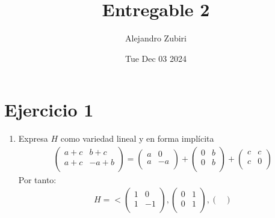 \documentclass{article}
\author{Alejandro Zubiri}
\date{Tue Dec 03 2024}
\title{Entregable 2}
\begin{document}
\maketitle
\tableofcontents
\pagebreak

\section{Ejercicio 1}
\begin{enumerate}[label = (\alph*)]
    \item Expresa $H$ como variedad lineal y en forma implícita
    \begin{equation}
        \begin{split}
            \begin{pmatrix}
                a+c & b+c \\
                a+c & -a+b \\
                \end{pmatrix} = \begin{pmatrix}
                a & 0 \\
                a & -a \\
                \end{pmatrix}+\begin{pmatrix}
                0 & b \\
                0 & b \\
                \end{pmatrix}+\begin{pmatrix}
                c & c \\
                c & 0 \\
                \end{pmatrix}
        \end{split}
    \end{equation}
    Por tanto:
    \begin{equation}
        \begin{split}
            H = <\begin{pmatrix}
                1 & 0 \\
                1 & -1 \\
                \end{pmatrix},\begin{pmatrix}
                0 & 1 \\
                0 & 1 \\
                \end{pmatrix},\begin{pmatrix}

\end{pmatrix}
\end{split}
\end{equation}
\end{enumerate}
\end{document}
